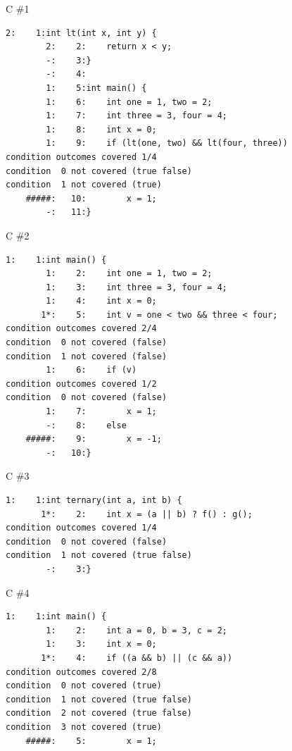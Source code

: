 \documentclass[xcolor = {dvipsnames, table}, aspectratio=169]{beamer}
\begin{document}
\begin{frame}[fragile, t]
    \begin{block}{C \#1}
        \begin{lstlisting}[basicstyle = \scriptsize\ttfamily]
        2:    1:int lt(int x, int y) {
        2:    2:    return x < y;
        -:    3:}
        -:    4:
        1:    5:int main() {
        1:    6:    int one = 1, two = 2;
        1:    7:    int three = 3, four = 4;
        1:    8:    int x = 0;
        1:    9:    if (lt(one, two) && lt(four, three))
condition outcomes covered 1/4
condition  0 not covered (true false)
condition  1 not covered (true)
    #####:   10:        x = 1;
        -:   11:}
        \end{lstlisting}
    \end{block}
\end{frame}

\begin{frame}[fragile, t]
    \begin{block}{C \#2}
        \begin{lstlisting}[basicstyle = \scriptsize\ttfamily]
        1:    1:int main() {
        1:    2:    int one = 1, two = 2;
        1:    3:    int three = 3, four = 4;
        1:    4:    int x = 0;
       1*:    5:    int v = one < two && three < four;
condition outcomes covered 2/4
condition  0 not covered (false)
condition  1 not covered (false)
        1:    6:    if (v)
condition outcomes covered 1/2
condition  0 not covered (false)
        1:    7:        x = 1;
        -:    8:    else
    #####:    9:        x = -1;
        -:   10:}
        \end{lstlisting}
    \end{block}
\end{frame}

\begin{frame}[fragile, t]
    \begin{block}{C \#3}
        \begin{lstlisting}[basicstyle = \scriptsize\ttfamily]
        1:    1:int ternary(int a, int b) {
       1*:    2:    int x = (a || b) ? f() : g();
condition outcomes covered 1/4
condition  0 not covered (false)
condition  1 not covered (true false)
        -:    3:}
        \end{lstlisting}
    \end{block}
\end{frame}

\begin{frame}[fragile, t]
    \begin{block}{C \#4}
        \begin{lstlisting}[basicstyle = \scriptsize\ttfamily]
        1:    1:int main() {
        1:    2:    int a = 0, b = 3, c = 2;
        1:    3:    int x = 0;
       1*:    4:    if ((a && b) || (c && a))
condition outcomes covered 2/8
condition  0 not covered (true)
condition  1 not covered (true false)
condition  2 not covered (true false)
condition  3 not covered (true)
    #####:    5:        x = 1;
        \end{lstlisting}
    \end{block}
\end{frame}
\end{document}
